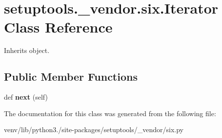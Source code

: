 \hypertarget{classsetuptools_1_1__vendor_1_1six_1_1_iterator}{}\section{setuptools.\+\_\+vendor.\+six.\+Iterator Class Reference}
\label{classsetuptools_1_1__vendor_1_1six_1_1_iterator}


Inherits object.

\subsection*{Public Member Functions}
\begin{DoxyCompactItemize}
\item 
\mbox{\label{classsetuptools_1_1__vendor_1_1six_1_1_iterator_a0e0430586a75518f56545da563b764c7}} 
def {\bfseries next} (self)
\end{DoxyCompactItemize}


The documentation for this class was generated from the following file\+:\begin{DoxyCompactItemize}
\item 
venv/lib/python3./site-\/packages/setuptools/\+\_\+vendor/six.\+py\end{DoxyCompactItemize}

